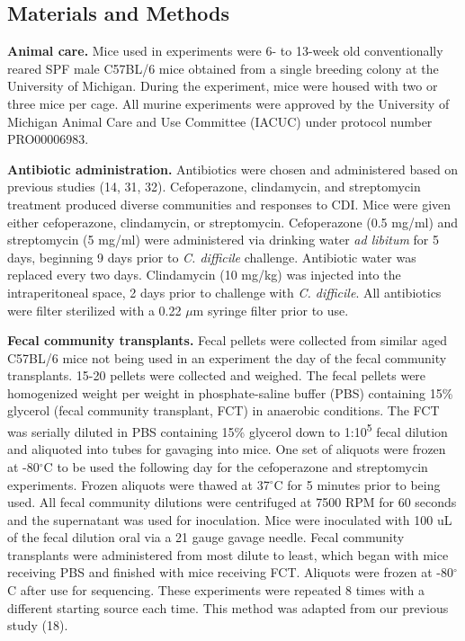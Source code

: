 \documentclass[
  12pt,
]{article}
\begin{document}
\hypertarget{materials-and-methods}{%
\subsection{Materials and Methods}\label{materials-and-methods}}

\textbf{Animal care.} Mice used in experiments were 6- to 13-week old
conventionally reared SPF male C57BL/6 mice obtained from a single
breeding colony at the University of Michigan. During the experiment,
mice were housed with two or three mice per cage. All murine experiments
were approved by the University of Michigan Animal Care and Use
Committee (IACUC) under protocol number PRO00006983.

\textbf{Antibiotic administration.} Antibiotics were chosen and
administered based on previous studies (14, 31, 32). Cefoperazone,
clindamycin, and streptomycin treatment produced diverse communities and
responses to CDI. Mice were given either cefoperazone, clindamycin, or
streptomycin. Cefoperazone (0.5 mg/ml) and streptomycin (5 mg/ml) were
administered via drinking water \emph{ad libitum} for 5 days, beginning
9 days prior to \emph{C. difficile} challenge. Antibiotic water was
replaced every two days. Clindamycin (10 mg/kg) was injected into the
intraperitoneal space, 2 days prior to challenge with \emph{C.
difficile}. All antibiotics were filter sterilized with a 0.22 \(\mu\)m
syringe filter prior to use.

\textbf{Fecal community transplants.} Fecal pellets were collected from
similar aged C57BL/6 mice not being used in an experiment the day of the
fecal community transplants. 15-20 pellets were collected and weighed.
The fecal pellets were homogenized weight per weight in phosphate-saline
buffer (PBS) containing 15\% glycerol (fecal community transplant, FCT)
in anaerobic conditions. The FCT was serially diluted in PBS containing
15\% glycerol down to 1:10\textsuperscript{5} fecal dilution and
aliquoted into tubes for gavaging into mice. One set of aliquots were
frozen at -80\(^\circ\)C to be used the following day for the
cefoperazone and streptomycin experiments. Frozen aliquots were thawed
at 37\(^\circ\)C for 5 minutes prior to being used. All fecal community
dilutions were centrifuged at 7500 RPM for 60 seconds and the
supernatant was used for inoculation. Mice were inoculated with 100 uL
of the fecal dilution oral via a 21 gauge gavage needle. Fecal community
transplants were administered from most dilute to least, which began
with mice receiving PBS and finished with mice receiving FCT. Aliquots
were frozen at -80\(^\circ\)C after use for sequencing. These
experiments were repeated 8 times with a different starting source each
time. This method was adapted from our previous study (18).
\end{document}
